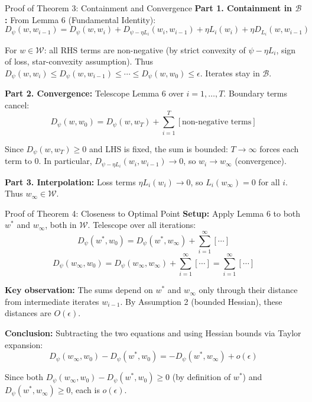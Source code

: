 \documentclass[aspectratio=169]{beamer}
\begin{document}
\begin{frame}{Proof of Theorem 3: Containment and Convergence}
    \vspace{-0.25cm}
    \textbf{Part 1. Containment in $\mathcal{B}$:} From Lemma 6 (Fundamental Identity):
    $$D_\psi(w, w_{i-1}) = D_\psi(w, w_i) + D_{\psi - \eta L_i}(w_i, w_{i-1}) + \eta L_i(w_i) + \eta D_{L_i}(w, w_{i-1})$$
    
    For $w \in \mathcal{W}$: all RHS terms are non-negative (by strict convexity of $\psi - \eta L_i$, sign of loss, star-convexity assumption). Thus $D_\psi(w, w_i) \leq D_\psi(w, w_{i-1}) \leq \cdots \leq D_\psi(w, w_0) \leq \epsilon$. Iterates stay in $\mathcal{B}$.
    
    \vspace{0.08cm}
    \textbf{Part 2. Convergence:} Telescope Lemma 6 over $i=1,\ldots, T$. Boundary terms cancel:
    $$D_\psi(w,w_0) = D_\psi(w,w_T) + \sum_{i=1}^T [\text{non-negative terms}]$$
    
    Since $D_\psi(w,w_T) \geq 0$ and LHS is fixed, the sum is bounded: $T \to \infty$ forces each term to 0. In particular, $D_{\psi-\eta L_i}(w_i,w_{i-1}) \to 0$, so $w_i \to w_\infty$ (convergence).
    
    \vspace{0.08cm}
    \textbf{Part 3. Interpolation:} Loss terms $\eta L_i(w_i) \to 0$, so $L_i(w_\infty) = 0$ for all $i$. Thus $w_\infty \in \mathcal{W}$.
\end{frame}

\begin{frame}{Proof of Theorem 4: Closeness to Optimal Point}
    \vspace{-0.25cm}
    \textbf{Setup:} Apply Lemma 6 to both $w^*$ and $w_\infty$, both in $\mathcal{W}$. Telescope over all iterations:
    $$D_\psi(w^*,w_0) = D_\psi(w^*,w_\infty) + \sum_{i=1}^\infty [\cdots]$$
    $$D_\psi(w_\infty,w_0) = D_\psi(w_\infty,w_\infty) + \sum_{i=1}^\infty [\cdots] = \sum_{i=1}^\infty [\cdots]$$
    
    \vspace{0.08cm}
    \textbf{Key observation:} The sums depend on $w^*$ and $w_\infty$ only through their distance from intermediate iterates $w_{i-1}$. By Assumption 2 (bounded Hessian), these distances are $O(\epsilon)$.
    
    \vspace{0.08cm}
    \textbf{Conclusion:} Subtracting the two equations and using Hessian bounds via Taylor expansion:
    $$D_\psi(w_\infty,w_0) - D_\psi(w^*,w_0) = -D_\psi(w^*,w_\infty) + o(\epsilon)$$
    
    Since both $D_\psi(w_\infty,w_0) - D_\psi(w^*,w_0) \geq 0$ (by definition of $w^*$) and $D_\psi(w^*,w_\infty) \geq 0$, each is $o(\epsilon)$.
\end{frame}
\end{document}
